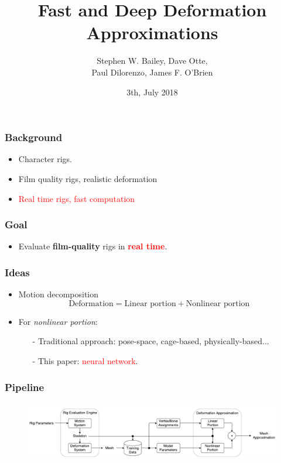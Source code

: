 \documentclass[serif,mathserif, 12pt]{beamer}
\title[\hspace{2em}\insertframenumber/\inserttotalframenumber]{Fast and Deep Deformation Approximations}
\date{3th, July 2018}
\author{Stephen W. Bailey, Dave Otte, \\Paul Dilorenzo, James F. O'Brien}
\newcommand{\TODO}[1]{\textcolor{red}{#1}}
\newcommand{\TODOG}[1]{\textcolor{green!50!black}{#1}}
\begin{document}
\maketitle

\begin{frame}
  \frametitle{Background}
  \begin{itemize}
  \item Character rigs.
    \pause
  \item \TODOG{Film quality rigs, realistic deformation}
  \item \TODO{Real time rigs, fast computation}
  \end{itemize}
\end{frame}

\begin{frame}
  \frametitle{Goal}
  \begin{itemize}
  \item Evaluate \textbf{\TODOG{film-quality}} rigs in \textbf{\TODO{real time}}.
  \end{itemize}
\end{frame}

\begin{frame}
  \frametitle{Ideas}
  \begin{itemize}
  \item Motion decomposition
    \[
    \text{Deformation} = \text{Linear portion} + \text{Nonlinear portion}
    \]
  \pause
  \item For \emph{nonlinear portion}:
    \begin{itemize}
    \item[-] Traditional approach: pose-space, cage-based, physically-based...
      \pause
    \item[-] This paper: \TODO{neural network}.
    \end{itemize}
  \end{itemize}
\end{frame}

\begin{frame}
  \frametitle{Pipeline}
  \begin{figure}
    \centering
    \includegraphics[width=\textwidth]{img/pipeline}
  \end{figure}
\end{frame}
\end{document}

